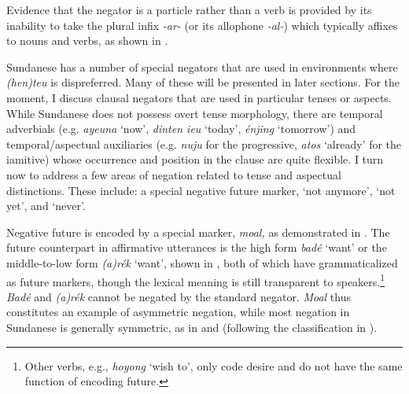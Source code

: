 \documentclass[output=paper]{langscibook}
\begin{document}
Evidence that the negator is a particle rather than a verb is provided by its inability to take the plural infix \textit{{}-ar-} (or its allophone \textit{{}-al-}) which typically affixes to nouns and verbs, as shown in .
 
\ea\label{ex:sun:2}
    \z
\z 

Sundanese has a number of special negators that are used in environments where \textit{(hen)teu} is dispreferred. Many of these will be presented in later sections. For the moment, I discuss clausal negators that are used in particular tenses or aspects. While Sundanese does not possess overt tense morphology, there are temporal adverbials (e.g. \textit{ayeuna} ‘now’, \textit{dinten ieu} ‘today’, \textit{énjing} ‘tomorrow’) and temporal/aspectual auxiliaries (e.g. \textit{nuju} for the progressive, \textit{atos} ‘already’ for the iamitive) whose occurrence and position in the clause are quite flexible. I turn now to address a few areas of negation related to tense and aspectual distinctions. These include: a special negative future marker, ‘not anymore’, ‘not yet’, and ‘never’. 

Negative future is encoded by a special marker, \textit{moal,} as demonstrated in . The future counterpart in affirmative utterances is the high form \textit{badé} ‘want’ or the middle-to-low form \textit{(a)rék} ‘want’, shown in , both of which have grammaticalized as future markers, though the lexical meaning is still transparent to speakers.\footnote{Other verbs, e.g., \textit{hoyong} ‘wish to’, only code desire and do not have the same function of encoding future.} \textit{Badé} and \textit{(a)rék} cannot be negated by the standard negator. \textit{Moal} thus constitutes an example of asymmetric negation, while most negation in Sundanese is generally symmetric, as in  and  (following the classification in \citealt{Miestamo2000, Miestamo2003, Miestamo2005}). 
\end{document}
